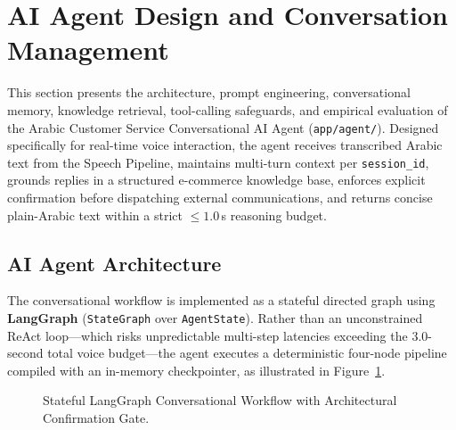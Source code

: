 
\section{AI Agent Design and Conversation Management}
\label{sec:agent_design}

This section presents the architecture, prompt engineering, conversational memory, knowledge retrieval, tool-calling safeguards, and empirical evaluation of the Arabic Customer Service Conversational AI Agent (\texttt{app/agent/}). Designed specifically for real-time voice interaction, the agent receives transcribed Arabic text from the Speech Pipeline, maintains multi-turn context per \texttt{session\_id}, grounds replies in a structured e-commerce knowledge base, enforces explicit confirmation before dispatching external communications, and returns concise plain-Arabic text within a strict $\le 1.0$\,s reasoning budget.

\subsection{AI Agent Architecture}
\label{subsec:agent_architecture}

The conversational workflow is implemented as a stateful directed graph using \textbf{LangGraph} (\texttt{StateGraph} over \texttt{AgentState}). Rather than an unconstrained ReAct loop—which risks unpredictable multi-step latencies exceeding the 3.0-second total voice budget—the agent executes a deterministic four-node pipeline compiled with an in-memory checkpointer, as illustrated in Figure~\ref{fig:agent_graph_flow}.

\begin{figure}[htbp]
\centering
\begin{center}
\end{center}
\caption{Stateful LangGraph Conversational Workflow with Architectural Confirmation Gate.}
\label{fig:agent_graph_flow}
\end{figure}

